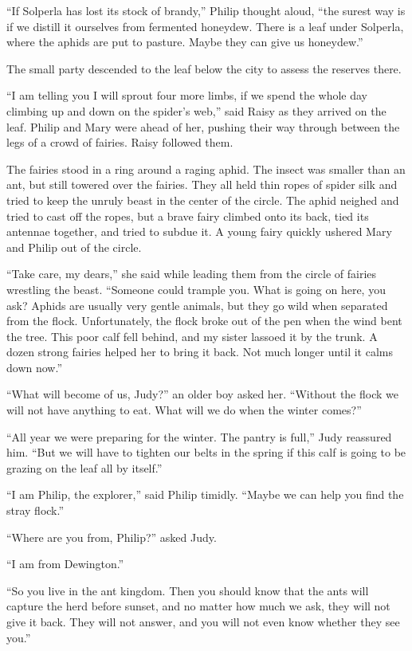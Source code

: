 \documentclass[10pt, draft]{memoir}
\begin{document}
``If Solperla has lost its stock of brandy,'' Philip thought aloud, ``the
surest way is if we distill it ourselves from fermented honeydew. There is a
leaf under Solperla, where the aphids are put to pasture. Maybe they can give
us honeydew.''

The small party descended to the leaf below the city to assess the reserves
there.

``I am telling you I will sprout four more limbs, if we spend the whole day
climbing up and down on the spider's web,'' said Raisy as they arrived on the
leaf. Philip and Mary were ahead of her, pushing their way through between the
legs of a crowd of fairies. Raisy followed them.

The fairies stood in a ring around a raging aphid. The insect was smaller than
an ant, but still towered over the fairies. They all held thin ropes of spider
silk and tried to keep the unruly beast in the center of the circle. The aphid
neighed and tried to cast off the ropes, but a brave fairy climbed onto its
back, tied its antennae together, and tried to subdue it. A young fairy quickly
ushered Mary and Philip out of the circle.

``Take care, my dears,'' she said while leading them from the circle of fairies
wrestling the beast. ``Someone could trample you. What is going on here, you
ask? Aphids are usually very gentle animals, but they go wild when separated
from the flock. Unfortunately, the flock broke out of the pen when the wind
bent the tree. This poor calf fell behind, and my sister lassoed it by the
trunk. A dozen strong fairies helped her to bring it back. Not much longer
until it calms down now.''

``What will become of us, Judy?'' an older boy asked her. ``Without the flock
we will not have anything to eat. What will we do when the winter comes?''

``All year we were preparing for the winter. The pantry is full,'' Judy
reassured him. ``But we will have to tighten our belts in the spring if this
calf is going to be grazing on the leaf all by itself.''

``I am Philip, the explorer,'' said Philip timidly. ``Maybe we can help you
find the stray flock.''

``Where are you from, Philip?'' asked Judy.

``I am from Dewington.''

``So you live in the ant kingdom. Then you should know that the ants will
capture the herd before sunset, and no matter how much we ask, they will not
give it back. They will not answer, and you will not even know whether they see
you.''
\end{document}
